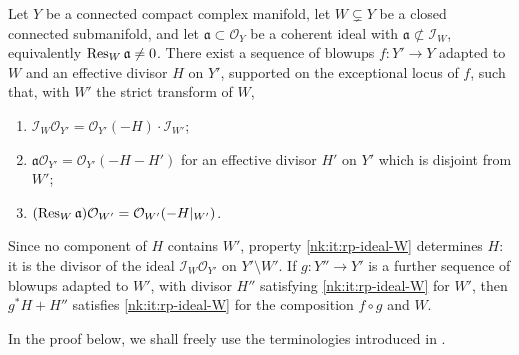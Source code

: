 \begin{lemma}\label{nk:lem:relative-principalization}
Let $Y$ be a connected compact complex manifold, let $W\subsetneq Y$ be a
closed connected submanifold, and let $\mathfrak a\subset\mathcal O_Y$ be a coherent ideal
with $\mathfrak a\not\subset\mathcal I_W$, equivalently
$\operatorname{Res}_{W}\mathfrak a\ne0$. There exist a sequence of blowups $f\colon Y'\to Y$
adapted to $W$ and an effective divisor $H$ on $Y'$, supported on the
exceptional locus of $f$, such that, with $W'$ the strict transform of
$W$,
\begin{enumerate}[label=\textup{(\roman*)},leftmargin=*,itemsep=.2em,topsep=.3em]
\item\label{nk:it:rp-ideal-W} $\mathcal I_W\mathcal O_{Y'}=\mathcal O_{Y'}(-H)\cdot\mathcal I_{W'}$;
\item\label{nk:it:rp-principal}
  $\mathfrak a\mathcal O_{Y'}=\mathcal O_{Y'}(-H-H')$ for an effective divisor
  $H'$ on $Y'$ which is disjoint from $W'$;
\item\label{nk:it:rp-restriction}
  $(\operatorname{Res}_{W}\mathfrak a)\mathcal O_{W'}=\mathcal O_{W'}(-H|_{W'})$.
\end{enumerate}
\end{lemma}

Since no component of $H$ contains $W'$, property \ref{nk:it:rp-ideal-W}
determines $H$: it is the divisor of the ideal $\mathcal I_W\mathcal O_{Y'}$ on
$Y'\setminus W'$. If $g\colon Y''\to Y'$ is a further sequence of
blowups adapted to $W'$, with divisor $H''$ satisfying
\ref{nk:it:rp-ideal-W} for $W'$, then $g^*H+H''$ satisfies
\ref{nk:it:rp-ideal-W} for the composition $f\circ g$ and $W$.

In the proof below, we shall freely use the terminologies introduced in \cite{BM08,Wlo05}.

